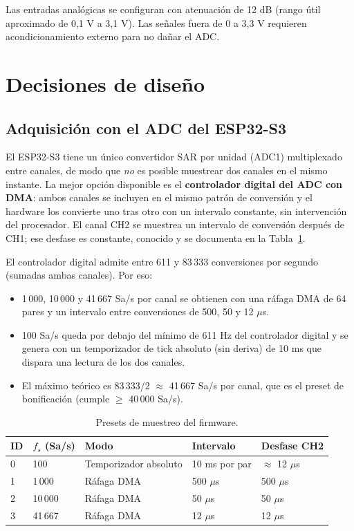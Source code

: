 \documentclass[12pt,a4paper]{article}
\begin{document}
Las entradas analógicas se configuran con atenuación de 12 dB (rango útil aproximado de 0{,}1 V a 3{,}1 V). Las señales fuera de 0 a 3{,}3 V requieren acondicionamiento externo para no dañar el ADC.

\section{Decisiones de diseño}

\subsection{Adquisición con el ADC del ESP32-S3}

El ESP32-S3 tiene un único convertidor SAR por unidad (ADC1) multiplexado entre canales, de modo que \emph{no} es posible muestrear dos canales en el mismo instante. La mejor opción disponible es el \textbf{controlador digital del ADC con DMA}: ambos canales se incluyen en el mismo patrón de conversión y el hardware los convierte uno tras otro con un intervalo constante, sin intervención del procesador. El canal CH2 se muestrea un intervalo de conversión después de CH1; ese desfase es constante, conocido y se documenta en la Tabla~\ref{tab:presets}.

El controlador digital admite entre 611 y 83\,333 conversiones por segundo (sumadas ambas canales). Por eso:

\begin{itemize}
  \item 1\,000, 10\,000 y 41\,667 Sa/s por canal se obtienen con una ráfaga DMA de 64 pares y un intervalo entre conversiones de 500, 50 y 12 $\mu$s.
  \item 100 Sa/s queda por debajo del mínimo de 611 Hz del controlador digital y se genera con un temporizador de tick absoluto (sin deriva) de 10 ms que dispara una lectura de los dos canales.
  \item El máximo teórico es 83\,333/2 $\approx$ 41\,667 Sa/s por canal, que es el preset de bonificación (cumple $\geq$ 40\,000 Sa/s).
\end{itemize}

\begin{table}[H]
\centering
\small
\begin{tabular}{@{}p{1.0cm} p{2.4cm} p{3.9cm} p{2.8cm} p{2.2cm}@{}}
\toprule
\textbf{ID} & \textbf{$f_s$ (Sa/s)} & \textbf{Modo} & \textbf{Intervalo} & \textbf{Desfase CH2} \\
\midrule
0 & 100    & Temporizador absoluto & 10 ms por par   & $\approx$ 12 $\mu$s \\
1 & 1\,000 & Ráfaga DMA            & 500 $\mu$s      & 500 $\mu$s \\
2 & 10\,000 & Ráfaga DMA           & 50 $\mu$s       & 50 $\mu$s \\
3 & 41\,667 & Ráfaga DMA           & 12 $\mu$s       & 12 $\mu$s \\
\bottomrule
\end{tabular}
\caption{Presets de muestreo del firmware.}
\label{tab:presets}
\end{table}
\end{document}
